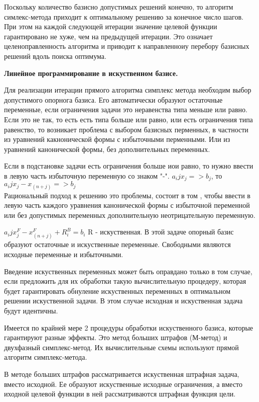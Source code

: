 Поскольку количество базисно допустимых решений конечно, то алгоритм симлекс-метода приходит к оптимальному решению за конечное число шагов.
При этом на каждой следующей итерации значение целевой функции гарантировано не хуже, чем на предыдущей итерации.
Это означает целеноправленность алгоритма и приводит к направленноиу перебору базисных решений вдоль поиска оптимума.


\Large{ \textbf {Линейное программирование в искуственном базисе.}}

Для реализации итерации прямого алгоритма симплекс метода необходим выбор допустимого опорнога базиса.
Его автоматически образуют остаточные переменные, если ограничения задачи это неравенства типа меньше или равно.
Если это не так, то есть есть типа больше или равно, или есть ограничения типа равенство, то возникает проблема с выбором базисных перменных,
в частности из уравнений какнонической формы с избыточными перменными.
Или из уравнений канонической формы, без дополнительных переменных.

Если в подстановке задачи есть ограничения больше иои равно, то нужно ввести в левую часть избыточную переменную со знаком "-".
$ a_ij x_j => b_j $, то $ a_ij x_j - x_(n+j )=> b_j $ \\

Рациональный подход к решению это проблемы, состоит в том ,
чтобы ввести в левую часть каждого уравнения канонической формы с избыточной переменной или без допустимых переменных
дополнительную неотрицательную переменную.

$ a_ij x_j^F - x_(n+j )^F + R_i^B = b_i $
R - искуственная.
В этой задаче опорный базис образуют остаточные и искуственные переменные. Свободными являются исходные переменные и избыточными.

Введение искуственных переменных может быть оправдано только в том случае,
если предложить для их обработки такую вычислительную процедеру,
которая будет гарантировать обнуление искуственных переменных в оптимальном решении искуственной задачи.
В этом случае исходная и искуственная задача будут идентичны.

Имеется по крайней мере 2 процедуры обработки искуственного базиса, которые гарантируют разные эффекты.
Это метод больших штрафов (М-метод) и двухфазный симплекс-метод.
Их вычислительные схемы используют прямой алгоритм симплекс-метода.

В методе больших штрафов рассматривается искуственная штрафная задача, вместо исходной.
Ее образуют искуственные исходные ограничения, а вместо иходной целевой функции в ней рассматриваются штрафная функция цели.

